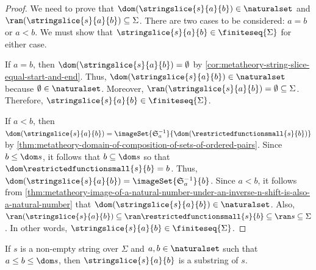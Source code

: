 \begin{proof}
    We need to prove that \( \dom \mleft( \stringslice{s}{a}{b} \mright) \in \naturalset \) and \( \ran \mleft( \stringslice{s}{a}{b} \mright) \subseteq \Sigma \).
    There are two cases to be considered: \( a = b \) or \( a < b \).
    We must show that \( \stringslice{s}{a}{b} \in \finiteseq{\Sigma} \) for either case.

    \vspace{0.3cm}
    \noindent
    If \( a = b \), then \( \dom \mleft( \stringslice{s}{a}{b} \mright) = \emptyset \) by \cref{cor:metatheory-string-slice-equal-start-and-end}.
    Thus, \( \dom \mleft( \stringslice{s}{a}{b} \mright) \in \naturalset \) because \( \emptyset \in \naturalset \).
    Moreover, \( \ran \mleft( \stringslice{s}{a}{b} \mright) = \emptyset \subseteq \Sigma \).
    Therefore, \( \stringslice{s}{a}{b} \in \finiteseq{\Sigma} \).

    \vspace{0.3cm}
    \noindent
    If \( a < b \), then \( \dom \mleft( \stringslice{s}{a}{b} \mright) = \imageSet{\mathfrak{S}^{-1}_{a}}{\dom \mleft( \restrictedfunctionsmall{s}{b} \mright)} \)
    by \cref{thm:metatheory-domain-of-composition-of-sets-of-ordered-pairs}.
    Since \( b \leq \dom s \), it follows that \( b \subseteq \dom s \) so that \( \dom \restrictedfunctionsmall{s}{b} = b \).
    Thus, \( \dom \mleft( \stringslice{s}{a}{b} \mright) = \imageSet{\mathfrak{S}^{-1}_{a}}{b} \).
    Since \( a < b \), it follows from \cref{thm:metatheory-image-of-a-natural-number-under-an-inverse-n-shift-is-also-a-natural-number} that
    \( \dom \mleft( \stringslice{s}{a}{b} \mright) \in \naturalset \).
    Also, \( \ran \mleft( \stringslice{s}{a}{b} \mright) \subseteq \ran \restrictedfunctionsmall{s}{b} \subseteq \ran s \subseteq \Sigma \).
    In other words, \( \stringslice{s}{a}{b} \in \finiteseq{\Sigma} \).
\end{proof}

\begin{thm}
     \label{thm:metatheory-every-slice-of-a-string-is-a-substring-of-the-string}
    If \( s \) is a non-empty string over \( \Sigma \) and \( a, b \in \naturalset \) such that \( a \leq b \leq \dom s \),
    then \( \stringslice{s}{a}{b} \) is a substring of \( s \).
\end{thm}

